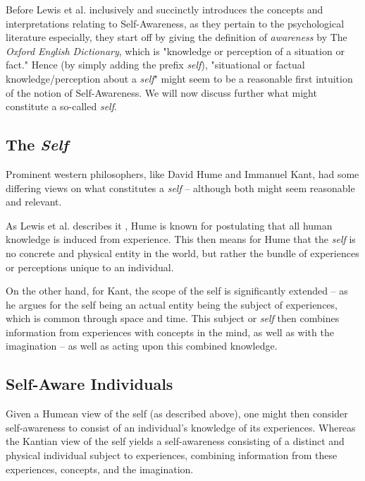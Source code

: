 	Before Lewis et al. \cite{sacs16_ch2} inclusively and succinctly introduces the concepts and interpretations relating to Self-Awareness, as they pertain to the psychological literature especially, they start off by giving the definition of \textit{awareness} by The \textit{Oxford English Dictionary}, which is "knowledge or perception of a situation or fact." Hence (by simply adding the prefix \textit{self}), "situational or factual knowledge/perception about a \textit{self}" might seem to be a reasonable first intuition of the notion of Self-Awareness. We will now discuss further what might constitute a so-called \textit{self}.


	\subsection{The \textit{Self}}

	Prominent western philosophers, like David Hume and Immanuel Kant, had some differing views on what constitutes a \textit{self} -- although both might seem reasonable and relevant. 

	As Lewis et al. describes it \cite{sacs16_ch2}, Hume is known for postulating that all human knowledge is induced from experience. This then means for Hume that the \textit{self} is no concrete and physical entity in the world, but rather the bundle of experiences or perceptions unique to an individual.

	On the other hand, for Kant, the scope of the self is significantly extended -- as he argues for the self being an actual entity being the subject of experiences, which is common through space and time. This subject or \textit{self} then combines information from experiences with concepts in the mind, as well as with the imagination -- as well as acting upon this combined knowledge.


	\subsection{Self-Aware Individuals}

	Given a Humean view of the self (as described above), one might then consider self-awareness to consist of an individual's knowledge of its experiences. Whereas the Kantian view of the self yields a self-awareness consisting of a distinct and physical individual subject to experiences, combining information from these experiences, concepts, and the imagination.

